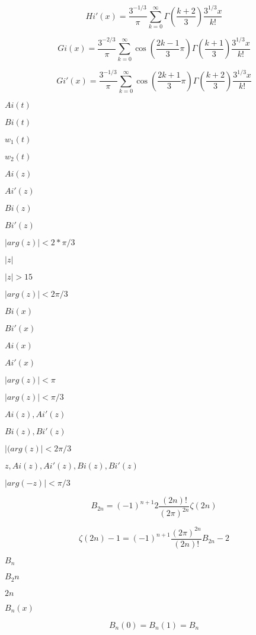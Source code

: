 \documentclass{article}
\begin{document}
\[ Hi'(x) = \frac{3^{-1/3}}{\pi} \sum_{k=0}^\infty \Gamma\left(\frac{k+2}{3}\right) \frac{3^{1/3}x}{k!} \]
\pagebreak

\[ Gi(x) = \frac{3^{-2/3}}{\pi} \sum_{k=0}^\infty \cos\left(\frac{2k-1}{3}\pi\right) \Gamma\left(\frac{k+1}{3}\right) \frac{3^{1/3}x}{k!} \]
\pagebreak

\[ Gi'(x) = \frac{3^{-1/3}}{\pi} \sum_{k=0}^\infty \cos\left(\frac{2k+1}{3}\pi\right) \Gamma\left(\frac{k+2}{3}\right) \frac{3^{1/3}x}{k!} \]
\pagebreak

$ Ai(t) $
\pagebreak

$ Bi(t) $
\pagebreak

$ w_1(t) $
\pagebreak

$ w_2(t) $
\pagebreak

$ Ai(z) $
\pagebreak

$ Ai'(z) $
\pagebreak

$ Bi(z) $
\pagebreak

$ Bi'(z) $
\pagebreak

$ |arg(z)| < 2*\pi/3 $
\pagebreak

$ |z| $
\pagebreak

$ |z| > 15 $
\pagebreak

$ |arg(z)| < 2\pi/3 $
\pagebreak

$ Bi(x) $
\pagebreak

$ Bi'(x) $
\pagebreak

$ Ai(x) $
\pagebreak

$ Ai'(x) $
\pagebreak

$ |arg(z)| < \pi $
\pagebreak

$ |arg(z)| < \pi/3 $
\pagebreak

$ Ai(z), Ai'(z) $
\pagebreak

$ Bi(z), Bi'(z) $
\pagebreak

$ |(arg(z)| < 2\pi/3 $
\pagebreak

$ z, Ai(z), Ai'(z), Bi(z), Bi'(z) $
\pagebreak

$ |arg(-z)| < \pi/3 $
\pagebreak

\[ B_{2n} = (-1)^{n+1} 2\frac{(2n)!}{(2\pi)^{2n}} \zeta(2n) \]
\pagebreak

\[ \zeta(2n) - 1 = (-1)^{n+1} \frac{(2\pi)^{2n}}{(2n)!} B_{2n} - 2 \]
\pagebreak

$ B_n $
\pagebreak

$ B_2n $
\pagebreak

$ 2n $
\pagebreak

$ B_n(x) $
\pagebreak

\[ B_n(0) = B_n(1) = B_n \]
\pagebreak
\end{document}
